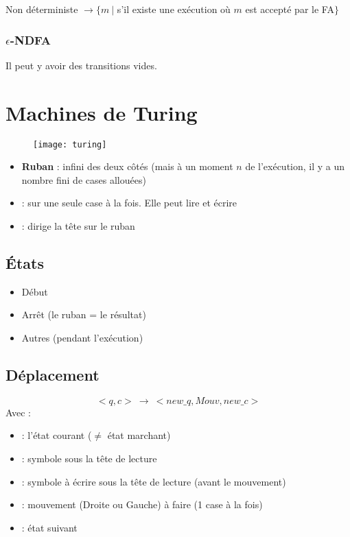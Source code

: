 Non déterministe $\rightarrow \{m\ |$ s'il existe une exécution où $m$ est accepté par le FA$\}$

\subsubsection{$\epsilon$-NDFA}

Il peut y avoir des transitions vides.

\newpage
\section{Machines de Turing}

\begin{figure}[H]
    \centering
    \texttt{[image: turing]}
\end{figure}

\begin{itemize}
\item \textbf{Ruban} : infini des deux côtés (mais à un moment $n$ de l'exécution, il y a un nombre fini de cases allouées)
\item {} : sur une seule case à la fois. Elle peut lire et écrire
\item {} : dirige la tête sur le ruban
\end{itemize}

\subsection{États}

\begin{itemize}
\item Début
\item Arrêt (le ruban = le résultat)
\item Autres (pendant l'exécution)
\end{itemize}

\subsection{Déplacement}

\begin{equation*}
<q, c>\ \rightarrow\ <new\_q, Mouv, new\_c>
\end{equation*}
Avec :

\begin{itemize}
\item {} : l'état courant ($\neq$ état marchant)
\item {} : symbole sous la tête de lecture
\item {} : symbole à écrire sous la tête de lecture (avant le mouvement)
\item {} : mouvement (Droite ou Gauche) à faire (1 case à la fois)
\item {} : état suivant
\end{itemize}

